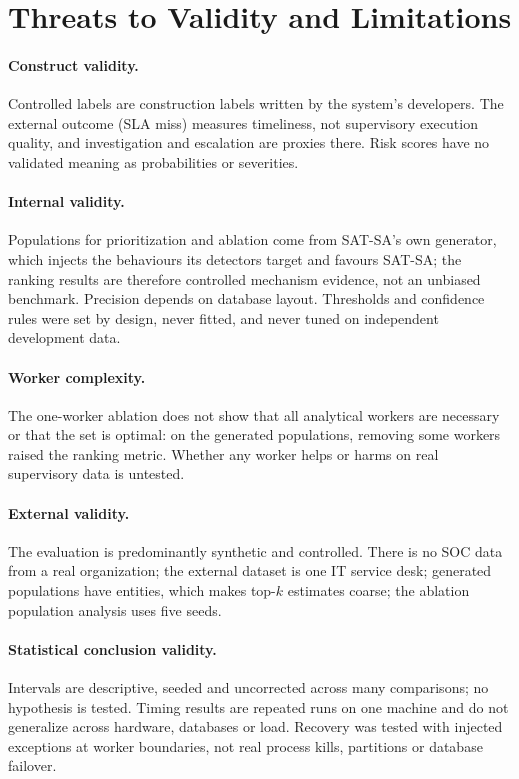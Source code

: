 \section{Threats to Validity and Limitations}
\label{sec:threats}

\paragraph{Construct validity.} Controlled labels are construction labels written by
the system's developers. The external outcome (SLA miss) measures timeliness, not
supervisory execution quality, and investigation and escalation are proxies there.
Risk scores have no validated meaning as probabilities or severities.

\paragraph{Internal validity.} Populations for prioritization and ablation come from
SAT-SA's own generator, which injects the behaviours its detectors target and favours
SAT-SA; the ranking results are therefore controlled mechanism evidence, not an
unbiased benchmark. Precision depends on database layout. Thresholds and confidence
rules were set by design, never fitted, and never tuned on independent development
data.

\paragraph{Worker complexity.} The one-worker ablation does not show that all
 analytical workers are necessary or that the set is optimal: on the
generated populations, removing some workers raised the ranking metric. Whether any
worker helps or harms on real supervisory data is untested.

\paragraph{External validity.} The evaluation is predominantly synthetic and
controlled. There is no SOC data from a real organization; the external dataset is one
IT service desk; generated populations have  entities, which makes
top-$k$ estimates coarse; the ablation population analysis uses five seeds.

\paragraph{Statistical conclusion validity.} Intervals are descriptive, seeded and
uncorrected across many comparisons; no hypothesis is tested. Timing results are
repeated runs on one machine and do not generalize across hardware, databases or load.
Recovery was tested with injected exceptions at worker boundaries, not real process
kills, partitions or database failover.

